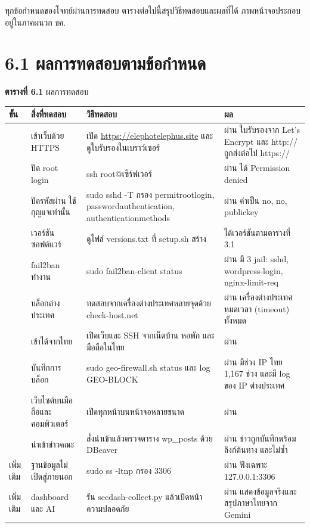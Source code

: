 
ทุกข้อกำหนดของโจทย์ผ่านการทดสอบ ตารางต่อไปนี้สรุปวิธีทดสอบและผลที่ได้ ภาพหน้าจอประกอบอยู่ในภาคผนวก ขค.

\section*{6.1 ผลการทดสอบตามข้อกำหนด}

\noindent\textbf{ตารางที่ 6.1} ผลการทดสอบ

\begingroup\small\begin{longtable}[]{@{}>{\raggedright\arraybackslash}p{}>{\raggedright\arraybackslash}p{}>{\raggedright\arraybackslash}p{}>{\raggedright\arraybackslash}p{}@{}}
\toprule\noalign{}
ขั้น & สิ่งที่ทดสอบ & วิธีทดสอบ & ผล \\
\midrule\noalign{}
\endhead
\bottomrule\noalign{}
\endlastfoot
1 & เข้าเว็บด้วย HTTPS & เปิด \url{https://elephotelephus.site} และดูใบรับรองในเบราว์เซอร์ & ผ่าน ใบรับรองจาก Let's Encrypt และ http:// ถูกส่งต่อไป https:// \\
1 & ปิด root login & ssh root@เซิร์ฟเวอร์ & ผ่าน ได้ Permission denied \\
1 & ปิดรหัสผ่าน ใช้กุญแจเท่านั้น & sudo sshd -T กรอง permitrootlogin, passwordauthentication, authenticationmethods & ผ่าน ค่าเป็น no, no, publickey \\
1 & เวอร์ชันซอฟต์แวร์ & ดูไฟล์ versions.txt ที่ setup.sh สร้าง & ได้เวอร์ชันตามตารางที่ 3.1 \\
1 & fail2ban ทำงาน & sudo fail2ban-client status & ผ่าน มี 3 jail: sshd, wordpress-login, nginx-limit-req \\
2 & บล็อกต่างประเทศ & ทดสอบจากเครื่องต่างประเทศหลายจุดด้วย check-host.net & ผ่าน เครื่องต่างประเทศหมดเวลา (timeout) ทั้งหมด \\
2 & เข้าได้จากไทย & เปิดเว็บและ SSH จากเน็ตบ้าน หอพัก และมือถือในไทย & ผ่าน \\
2 & บันทึกการบล็อก & sudo geo-firewall.sh status และ log GEO-BLOCK & ผ่าน มีช่วง IP ไทย 1,167 ช่วง และมี log ของ IP ต่างประเทศ \\
3 & เว็บไซต์บนมือถือและคอมพิวเตอร์ & เปิดทุกหน้าบนหน้าจอหลายขนาด & ผ่าน \\
3 & นำเข้าข่าวคณะ & สั่งนำเข้าแล้วตรวจตาราง wp\_posts ด้วย DBeaver & ผ่าน ข่าวถูกบันทึกพร้อมลิงก์ต้นทาง และไม่ซ้ำ \\
เพิ่มเติม & ฐานข้อมูลไม่เปิดสู่ภายนอก & sudo ss -ltnp กรอง 3306 & ผ่าน ฟังเฉพาะ 127.0.0.1:3306 \\
เพิ่มเติม & dashboard และ AI & รัน secdash-collect.py แล้วเปิดหน้า ความปลอดภัย & ผ่าน แสดงข้อมูลจริงและสรุปภาษาไทยจาก Gemini \\
\end{longtable}\endgroup

